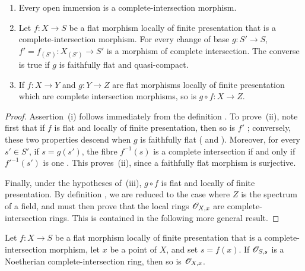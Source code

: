 \begin{proposition}[19.3.9]
\label{IV.19.3.9}
\medskip\noindent
\begin{enumerate}[label=\textup{(\roman*)}]
  \item Every open immersion is a complete-intersection morphism.
  \item Let $f:X\to S$ be a flat morphism locally of finite presentation that is a complete-intersection morphism.
For every change of base $g:S'\to S$, $f'=f_{(S')}:X_{(S')}\to S'$ is a morphism of complete intersection.
The converse is true if $g$ is faithfully flat and quasi-compact.
  \item If $f:X\to Y$ and $g:Y\to Z$ are flat morphisms locally of finite presentation which are complete intersection morphisms, so is $g\circ f:X\to Z$.
\end{enumerate}
\end{proposition}

\begin{proof}
Assertion~(i) follows immediately from the definition .
To prove~(ii), note first that if $f$ is flat and locally of finite presentation, then so is $f'$ ; conversely, these two properties descend when $g$ is faithfully flat ( and ). Moreover, for every $s'\in S'$, if $s=g(s')$, the fibre $f^{-1}(s)$ is a complete intersection if and only if $f'^{-1}(s')$ is one . This proves~(ii), since a faithfully flat morphism is surjective.

Finally, under the hypotheses of~(iii), $g\circ f$ is flat and locally of finite presentation.
By definition , we are reduced to the case where $Z$ is the spectrum of a field, and must then prove that the local rings $\mathscr{O}_{X,x}$ are complete-intersection rings. This is contained in the following more general result.
\end{proof}

\begin{corollary}[19.3.10]
\label{IV.19.3.10}
Let $f:X\to S$ be a flat morphism locally of finite presentation that is a complete-intersection morphism, let $x$ be a point of $X$, and set $s=f(x)$.
If $\mathscr{O}_{S,s}$ is a Noetherian complete-intersection ring, then so is $\mathscr{O}_{X,x}$.
\end{corollary}

